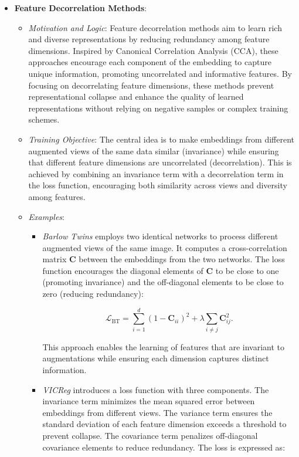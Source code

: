 \begin{itemize}
    \item \textbf{Feature Decorrelation Methods}:
    \begin{itemize}
        \item \emph{Motivation and Logic}: Feature decorrelation methods aim to learn rich and diverse representations by reducing redundancy among feature dimensions. Inspired by Canonical Correlation Analysis (CCA), these approaches encourage each component of the embedding to capture unique information, promoting uncorrelated and informative features. By focusing on decorrelating feature dimensions, these methods prevent representational collapse and enhance the quality of learned representations without relying on negative samples or complex training schemes.
        
        \item \emph{Training Objective}: The central idea is to make embeddings from different augmented views of the same data similar (invariance) while ensuring that different feature dimensions are uncorrelated (decorrelation). This is achieved by combining an invariance term with a decorrelation term in the loss function, encouraging both similarity across views and diversity among features.
        
        \item \emph{Examples}:
        \begin{itemize}
            \item \emph{Barlow Twins} \citep{zbontar2021barlow} employs two identical networks to process different augmented views of the same image. It computes a cross-correlation matrix \( \mathbf{C} \) between the embeddings from the two networks. The loss function encourages the diagonal elements of \( \mathbf{C} \) to be close to one (promoting invariance) and the off-diagonal elements to be close to zero (reducing redundancy):
        
            \[
            \mathcal{L}_{\text{BT}} = \sum_{i=1}^d (1 - \mathbf{C}_{ii})^2 + \lambda \sum_{i \neq j} \mathbf{C}_{ij}^2.
            \]
        
            This approach enables the learning of features that are invariant to augmentations while ensuring each dimension captures distinct information.
        
            \item \emph{VICReg} \citep{bardes2021vicreg} introduces a loss function with three components. The invariance term minimizes the mean squared error between embeddings from different views. The variance term ensures the standard deviation of each feature dimension exceeds a threshold to prevent collapse. The covariance term penalizes off-diagonal covariance elements to reduce redundancy. The loss is expressed as:
        

\end{itemize}
\end{itemize}
\end{itemize}
